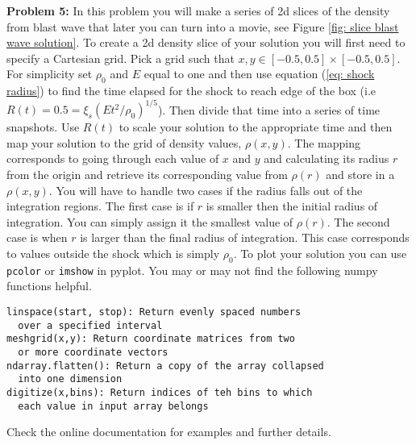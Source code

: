 \documentclass{article}
\begin{document}
\bigskip
\noindent
\textbf{Problem 5:} In this problem you will make a series of 2d slices of the density from blast wave that later you can turn into a movie, see Figure \ref{fig: slice blast wave solution}. To create a 2d density slice of your solution you will first need to specify a Cartesian grid. Pick a grid such that $x,y\in [-0.5,0.5]\times[-0.5,0.5]$. For simplicity set $\rho_0$ and $E$ equal to one and then use equation (\ref{eq: shock radius}) to find the time elapsed for the shock to reach edge of the box (i.e $R(t)=0.5=\xi_s (Et^2/\rho_0)^{1/5}$). Then divide that time into a series of time snapshots. Use $R(t)$ to scale your solution to the appropriate time and then map your solution to the grid of density values, $\rho(x,y)$. The mapping corresponds to going through each value of $x$ and $y$ and calculating its radius $r$ from the origin and retrieve its corresponding value from $\rho(r)$ and store in a $\rho(x,y)$. You will have to handle two cases if the radius falls out of the integration regions. The first case is if $r$ is smaller then the initial radius of integration. You can simply assign it the smallest value of $\rho(r)$. The second case is when $r$ is larger than the final radius of integration. This case corresponds to values outside the shock which is simply $\rho_0$. To plot your solution you can use {\tt pcolor} or {\tt imshow} in pyplot. You may or may not find the following numpy functions helpful. 
\begin{verbatim}
linspace(start, stop): Return evenly spaced numbers
  over a specified interval
meshgrid(x,y): Return coordinate matrices from two
  or more coordinate vectors
ndarray.flatten(): Return a copy of the array collapsed
  into one dimension
digitize(x,bins): Return indices of teh bins to which
  each value in input array belongs
\end{verbatim}
Check the online documentation for examples and further details.
\end{document}
